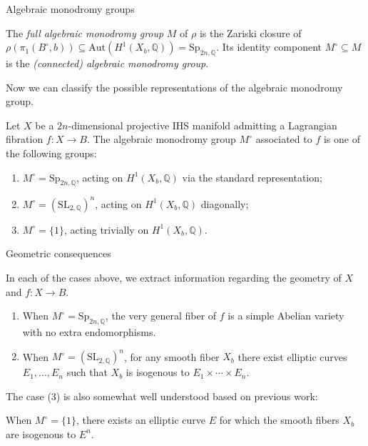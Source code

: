 \documentclass{beamer}
\begin{document}
\begin{frame}{Algebraic monodromy groups}

\begin{Definition}
The {\it full algebraic monodromy group} \(M\) of \(\rho\) is the Zariski closure of 
\(\rho(\pi_1(B^\circ, b)) \subseteq \mathrm{Aut}(H^1(X_b, \mathbb{Q})) = 
\mathrm{Sp}_{2n, \mathbb{Q}}\). Its identity component 
\(M^\circ \subseteq M\) is the {\it (connected) algebraic monodromy group}.
\end{Definition}
\pause

Now we can classify the possible representations of the algebraic monodromy group.

\begin{Theorem}[V `26+]
Let \(X\) be a \(2n\)-dimensional projective IHS manifold admitting a Lagrangian fibration 
\(f: X \to B\). The algebraic monodromy group \(M^\circ\) associated to \(f\) is 
one of the following groups: \pause
\begin{enumerate}
    \item \(M^\circ = \mathrm{Sp}_{2n, \mathbb Q}\), acting on \(H^1(X_b, \mathbb Q)\) 
    via the standard representation; \pause
    \item \(M^\circ = (\mathrm{SL}_{2, \mathbb Q})^n\), acting on \(H^1(X_b, \mathbb Q)\)
    diagonally; \pause
    \item \(M^\circ = \{1\}\), acting trivially on \(H^1(X_b, \mathbb{Q})\).
\end{enumerate}
\end{Theorem}

\end{frame}



\begin{frame}{Geometric consequences}

In each of the cases above, we extract information regarding the geometry 
of \(X\) and \(f: X \to B\). \pause

\begin{Theorem}[V `26+]
\begin{enumerate}
    \item When \(M^\circ = \mathrm{Sp}_{2n, \mathbb Q}\), the very general fiber 
    of \(f\) is a simple Abelian variety with no extra endomorphisms. \pause
    \item When \(M^\circ = (\mathrm{SL_{2, \mathbb Q}})^n\), for any smooth fiber 
    \(X_b\) there exist elliptic curves \(E_1, \dots, E_n\) such that \(X_b\) 
    is isogenous to \(E_1 \times \cdots \times E_n\).
\end{enumerate}
\end{Theorem}
\pause

The case (3) is also somewhat well understood based on previous work:

\begin{Theorem}
    When \(M^\circ = \{1\}\), there exists an elliptic curve \(E\) 
    for which the smooth fibers \(X_b\) are isogenous to \(E^n\).
\end{Theorem}

\end{frame}
\end{document}
